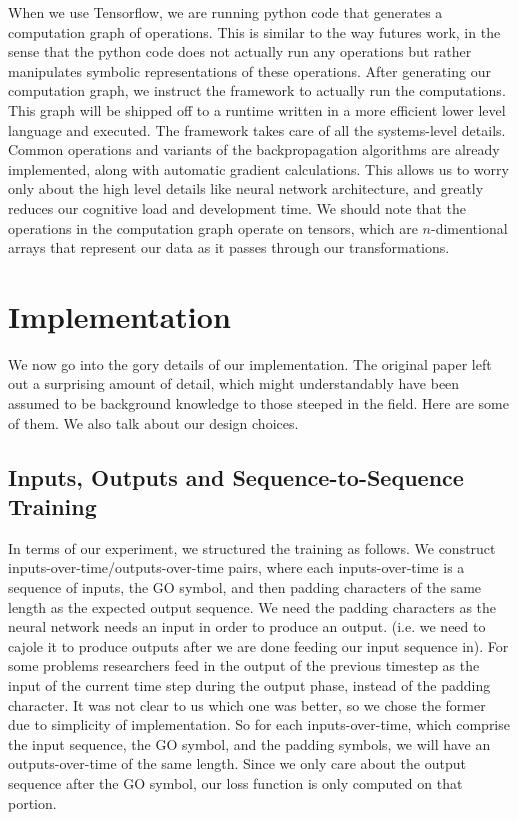 \documentclass[12pt]{article}
\begin{document}
When we use Tensorflow, we are running python code that generates a computation
graph of operations. This is similar to the way futures work, in the sense
that the python code does not actually run any operations but rather
manipulates symbolic representations of these operations. After generating
our computation graph, we instruct the framework to actually run the computations.
This graph will be shipped off to a runtime written in a more efficient lower level
language and executed. The framework takes care of all the systems-level details.
Common operations and variants of the backpropagation algorithms are already implemented,
along with automatic gradient calculations. This allows us to worry only about the
high level details like neural network architecture, and greatly reduces our cognitive
load and development time. We should note that the operations in the computation graph
operate on tensors, which are $n$-dimentional arrays that represent our data as
it passes through our transformations.

\section{Implementation}\label{implementation}

We now go into the gory details of our implementation. The original paper left out
a surprising amount of detail, which might understandably have been
assumed to be background knowledge to those steeped in the field. Here are
some of them. We also talk about our design choices.

\subsection{Inputs, Outputs and Sequence-to-Sequence Training}

In terms of our experiment, we structured the training as follows. We
construct inputs-over-time/outputs-over-time pairs, where each inputs-over-time
is a sequence of inputs, the GO symbol, and then padding characters of the same length as the
expected output sequence. We need the padding characters as the neural network needs an input in order to
produce an output. (i.e. we need to cajole it to produce outputs after we are done
feeding our input sequence in). For some problems researchers feed in the output of the previous
timestep as the input of the current time step during the output phase,
instead of the padding character.
It was not clear to us which one was better, so
we chose the former due to simplicity of implementation. So for each inputs-over-time,
which comprise the input sequence, the GO symbol, and the padding symbols,
we will have an outputs-over-time of the same length.
Since we only care about the output sequence after the GO symbol,
our loss function is only computed on that portion.
\end{document}
